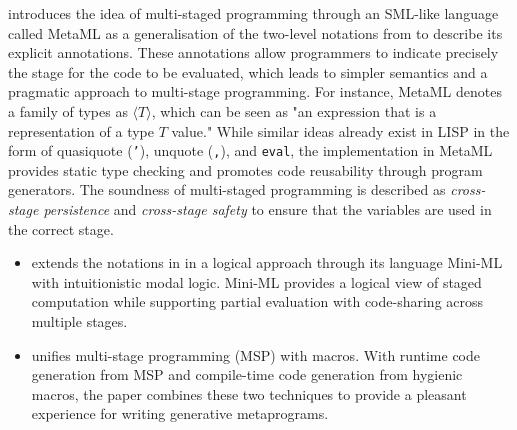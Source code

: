 \begin{itemize}
\cite{10.1145/258994.259019} introduces the idea of multi-staged programming through an SML-like language called MetaML as a generalisation of the two-level notations from \cite{2level} to describe its explicit annotations. These annotations allow programmers to indicate precisely the stage for the code to be evaluated, which leads to simpler semantics and a pragmatic approach to multi-stage programming. For instance, MetaML denotes a family of types as $\langle T \rangle$, which can be seen as "an expression that is a representation of a type $T$ value." While similar ideas already exist in LISP in the form of quasiquote (\texttt{'}), unquote (\texttt{,}), and \texttt{eval}, the implementation in MetaML provides static type checking and promotes code reusability through program generators. The soundness of multi-staged programming is described as \emph{cross-stage persistence} and \emph{cross-stage safety} to ensure that the variables are used in the correct stage. %


\begin{itemize}
    \item \cite{miniml} extends the notations in \cite{2level} in a logical approach through its language Mini-ML with intuitionistic modal logic. Mini-ML provides a logical view of staged computation while supporting partial evaluation with code-sharing across multiple stages.
    \item \cite{unify} unifies multi-stage programming (MSP) with macros. With runtime code generation from MSP and compile-time code generation from hygienic macros, the paper combines these two techniques to provide a pleasant experience for writing generative metaprograms.
\end{itemize}


\end{itemize}
